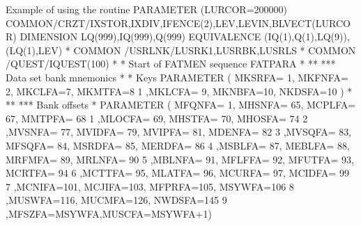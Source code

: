 \begin{XMPt}{Example of using the routine \protect{}}
      PARAMETER (LURCOR=200000)                                         
      COMMON/CRZT/IXSTOR,IXDIV,IFENCE(2),LEV,LEVIN,BLVECT(LURCOR)       
      DIMENSION    LQ(999),IQ(999),Q(999)                               
      EQUIVALENCE (IQ(1),Q(1),LQ(9)),(LQ(1),LEV)                        
*                                                                       
      COMMON /USRLNK/LUSRK1,LUSRBK,LUSRLS                               
*                                                                       
      COMMON /QUEST/IQUEST(100)                                         
*                                                                       
* Start of FATMEN sequence FATPARA                                      
*                                                                       
** ***     Data set bank mnemonics                                      
*                                                                       
*          Keys                                                         
      PARAMETER ( MKSRFA= 1, MKFNFA= 2, MKCLFA=7, MKMTFA=8              
     1           ,MKLCFA= 9, MKNBFA=10, NKDSFA=10 )                     
*                                                                       
** ***     Bank offsets                                                 
*                                                                       
      PARAMETER ( MFQNFA=  1, MHSNFA= 65, MCPLFA= 67, MMTPFA= 68        
     1           ,MLOCFA= 69, MHSTFA= 70, MHOSFA= 74                    
     2           ,MVSNFA= 77, MVIDFA= 79, MVIPFA= 81, MDENFA= 82        
     3           ,MVSQFA= 83, MFSQFA= 84, MSRDFA= 85, MERDFA= 86        
     4           ,MSBLFA= 87, MEBLFA= 88, MRFMFA= 89, MRLNFA= 90        
     5           ,MBLNFA= 91, MFLFFA= 92, MFUTFA= 93, MCRTFA= 94        
     6           ,MCTTFA= 95, MLATFA= 96, MCURFA= 97, MCIDFA= 99        
     7           ,MCNIFA=101, MCJIFA=103, MFPRFA=105, MSYWFA=106        
     8           ,MUSWFA=116, MUCMFA=126, NWDSFA=145                    
     9           ,MFSZFA=MSYWFA,MUSCFA=MSYWFA+1)                        
                                                                        

\end{XMPt}
